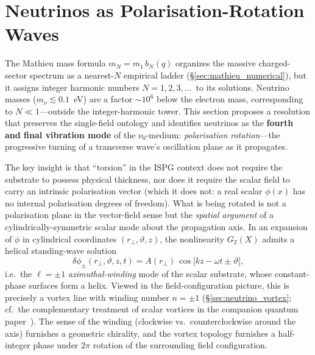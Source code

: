 \documentclass[11pt]{article}
\begin{document}
\section{Neutrinos as Polarisation-Rotation Waves}
\label{sec:neutrinos}

The Mathieu mass formula $m_N = m_1\,b_N(q)$
organizes the massive charged-sector spectrum as a
nearest-$N$ empirical ladder
(\S\ref{sec:mathieu_numerical}), but it assigns
integer harmonic numbers $N = 1, 2, 3,\ldots$\
to its solutions.  Neutrino masses
($m_\nu \lesssim 0.1$~eV) are a factor
$\sim 10^{6}$ below the electron mass,
corresponding to $N \ll 1$---outside the
integer-harmonic tower.  This section proposes
a resolution that preserves the single-field
ontology and identifies neutrinos as
the \textbf{fourth and final vibration mode}
of the $\nu_0$-medium: \emph{polarisation
rotation}---the progressive turning of a
transverse wave's oscillation plane as it
propagates.

The key insight is that ``torsion'' in the
ISPG context does not require the substrate
to possess physical thickness, nor does it
require the scalar field to carry an intrinsic
polarisation vector (which it does not: a real
scalar $\phi(x)$ has no internal polarisation
degrees of freedom).  What is being rotated is
not a polarisation plane in the
vector-field sense but the \emph{spatial
argument} of a cylindrically-symmetric scalar
mode about the propagation axis.  In an
expansion of $\phi$ in cylindrical coordinates
$(r_\perp,\vartheta,z)$, the nonlinearity
$G_2(X)$ admits a helical standing-wave
solution
\begin{equation}\label{eq:neutrino_helical}
  \delta\phi_\pm(r_\perp,\vartheta,z,t)
  = A(r_\perp)\,
    \cos\!\bigl[kz - \omega t \pm \vartheta\bigr],
\end{equation}
i.e.\ the $\ell = \pm 1$ \emph{azimuthal-winding}
mode of the scalar substrate, whose constant-phase
surfaces form a helix.  Viewed in the
field-configuration picture, this is precisely
a vortex line with winding number
$n = \pm 1$ (\S\ref{sec:neutrino_vortex};
cf.\ the complementary treatment of scalar
vortices in the companion quantum
paper~\cite{Lotishvili2026Quantum}).  The sense
of the winding (clockwise vs.\ counterclockwise
around the axis) furnishes a geometric
chirality, and the vortex topology furnishes a
half-integer phase under $2\pi$ rotation of
the surrounding field configuration.
\end{document}
